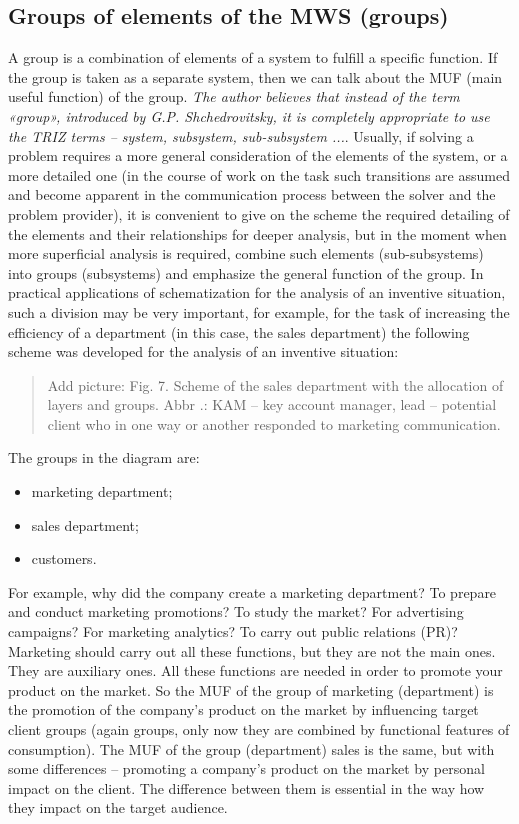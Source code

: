 \documentclass[11pt,a4paper]{book}
\newcommand{\addpicture}[1]{
  \begin{quote} Add picture: #1\end{quote}
}
\begin{document}
\subsection{Groups of elements of the MWS (groups)}

A group is a combination of elements of a system to fulfill a specific
function.  If the group is taken as a separate system, then we can talk about
the MUF (main useful function) of the group. \emph{The author believes that
  instead of the term «group», introduced by G.P. Shchedrovitsky, it is
  completely appropriate to use the TRIZ terms -- system, subsystem,
  sub-subsystem ...}. Usually, if solving a problem requires a more general
consideration of the elements of the system, or a more detailed one (in the
course of work on the task such transitions are assumed and become apparent in
the communication process between the solver and the problem provider), it is
convenient to give on the scheme the required detailing of the elements and
their relationships for deeper analysis, but in the moment when more
superficial analysis is required, combine such elements (sub-subsystems) into
groups (subsystems) and emphasize the general function of the group. In
practical applications of schematization for the analysis of an inventive
situation, such a division may be very important, for example, for the task of
increasing the efficiency of a department (in this case, the sales department)
the following scheme was developed for the analysis of an inventive situation:

\addpicture{Fig. 7. Scheme of the sales department with the allocation of
  layers and groups. Abbr .: KAM -- key account manager, lead -- potential
  client who in one way or another responded to marketing communication.}

The groups in the diagram are:
\begin{itemize}[noitemsep]
\item marketing department; 
\item sales department; 
\item customers.
\end{itemize}
For example, why did the company create a marketing department? To prepare and
conduct marketing promotions? To study the market? For advertising campaigns?
For marketing analytics? To carry out public relations (PR)? Marketing should
carry out all these functions, but they are not the main ones. They are
auxiliary ones. All these functions are needed in order to promote your
product on the market. So the MUF of the group of marketing (department) is
the promotion of the company's product on the market by influencing target
client groups (again groups, only now they are combined by functional features
of consumption). The MUF of the group (department) sales is the same, but with
some differences -- promoting a company's product on the market by personal
impact on the client. The difference between them is essential in the way how
they impact on the target audience.
\end{document}
